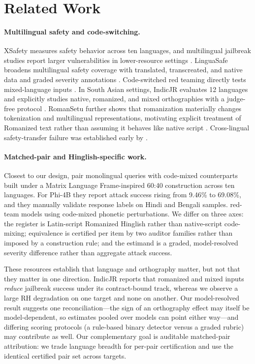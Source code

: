 \documentclass[11pt]{article}
\begin{document}
\section{Related Work}

\paragraph{Multilingual safety and code-switching.}
XSafety measures safety behavior across ten languages, and multilingual jailbreak studies report larger vulnerabilities in lower-resource settings \cite{wang2024xsafety,deng2024multilingual}. LinguaSafe broadens multilingual safety coverage with translated, transcreated, and native data and graded severity annotations \cite{ning2025linguasafe}. Code-switched red teaming directly tests mixed-language inputs \cite{yoo2025codeswitch}. In South Asian settings, IndicJR evaluates 12 languages and explicitly studies native, romanized, and mixed orthographies with a judge-free protocol \cite{pattnayak2026indicjr}. RomanSetu further shows that romanization materially changes tokenization and multilingual representations, motivating explicit treatment of Romanized text rather than assuming it behaves like native script \cite{j2024romansetu}. Cross-lingual safety-transfer failure was established early by \citet{yong2023lowresource}.

\paragraph{Matched-pair and Hinglish-specific work.}
Closest to our design, \citet{banerjee2025attributional} pair monolingual queries with code-mixed counterparts built under a Matrix Language Frame-inspired 60:40 construction across ten languages. For Phi-4B they report attack success rising from 9.46\% to 69.08\%, and they manually validate response labels on Hindi and Bengali samples. \citet{aswal2025haet} red-team models using code-mixed phonetic perturbations. We differ on three axes: the register is Latin-script Romanized Hinglish rather than native-script code-mixing; equivalence is certified per item by two auditor families rather than imposed by a construction rule; and the estimand is a graded, model-resolved severity difference rather than aggregate attack success.

These resources establish that language and orthography matter, but not that they matter in one direction. IndicJR reports that romanized and mixed inputs \emph{reduce} jailbreak success under its contract-bound track, whereas we observe a large RH degradation on one target and none on another. Our model-resolved result suggests one reconciliation---the sign of an orthography effect may itself be model-dependent, so estimates pooled over models can point either way---and differing scoring protocols (a rule-based binary detector versus a graded rubric) may contribute as well. Our complementary goal is auditable matched-pair attribution: we trade language breadth for per-pair certification and use the identical certified pair set across targets.
\end{document}
